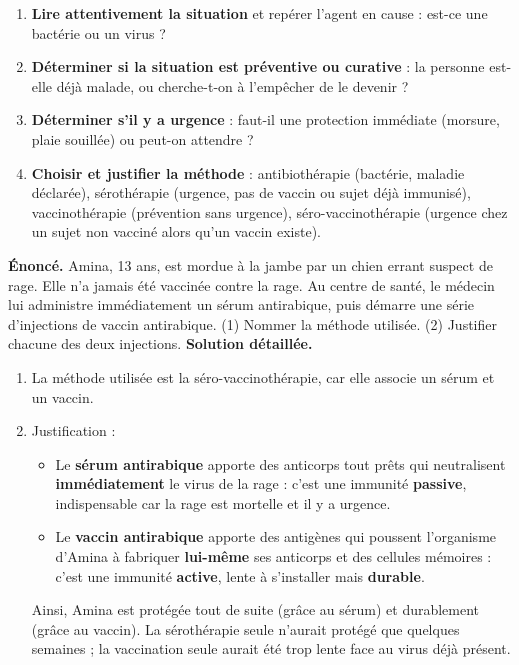\documentclass[11pt]{article}
\newcommand{\cle}[1]{{\popxbold\color{popdark}#1}}
\begin{document}
\begin{methode}
\begin{enumerate}
\item \textbf{Lire attentivement la situation} et repérer l'agent en cause : est-ce une bactérie ou un virus ?
\item \textbf{Déterminer si la situation est préventive ou curative} : la personne est-elle déjà malade, ou cherche-t-on à l'empêcher de le devenir ?
\item \textbf{Déterminer s'il y a urgence} : faut-il une protection immédiate (morsure, plaie souillée) ou peut-on attendre ?
\item \textbf{Choisir et justifier la méthode} : antibiothérapie (bactérie, maladie déclarée), sérothérapie (urgence, pas de vaccin ou sujet déjà immunisé), vaccinothérapie (prévention sans urgence), séro-vaccinothérapie (urgence chez un sujet non vacciné alors qu'un vaccin existe).
\end{enumerate}
\end{methode}

\begin{exoresolu}
\textbf{Énoncé.} Amina, 13 ans, est mordue à la jambe par un chien errant suspect de rage. Elle n'a jamais été vaccinée contre la rage. Au centre de santé, le médecin lui administre immédiatement un sérum antirabique, puis démarre une série d'injections de vaccin antirabique. (1) Nommer la méthode utilisée. (2) Justifier chacune des deux injections.
\tcblower
\textbf{Solution détaillée.}
\begin{enumerate}
\item La méthode utilisée est la \cle{séro-vaccinothérapie}, car elle associe un sérum et un vaccin.
\item Justification :
\begin{itemize}
\item Le \textbf{sérum antirabique} apporte des anticorps tout prêts qui neutralisent \textbf{immédiatement} le virus de la rage : c'est une immunité \textbf{passive}, indispensable car la rage est mortelle et il y a urgence.
\item Le \textbf{vaccin antirabique} apporte des antigènes qui poussent l'organisme d'Amina à fabriquer \textbf{lui-même} ses anticorps et des cellules mémoires : c'est une immunité \textbf{active}, lente à s'installer mais \textbf{durable}.
\end{itemize}
Ainsi, Amina est protégée tout de suite (grâce au sérum) et durablement (grâce au vaccin). La sérothérapie seule n'aurait protégé que quelques semaines ; la vaccination seule aurait été trop lente face au virus déjà présent.
\end{enumerate}
\end{exoresolu}
\end{document}
